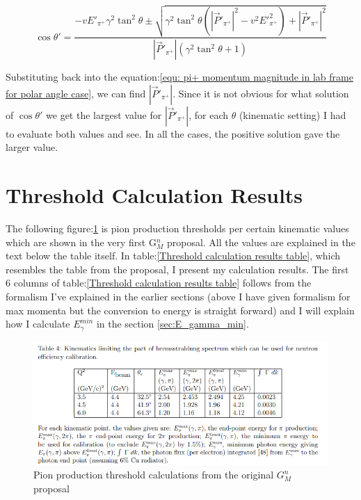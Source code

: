 \documentclass[11pt,letterpaper]{article}
\begin{document}
  \begin{equation}
    \cos{\theta'} = \frac{-vE'_{\pi^+}\gamma^2\tan^2{\theta} \pm \sqrt{\gamma^2\tan^2{\theta}(|\vec{P}'_{\pi^+}|^2-v^2E'^{2}_{\pi^+})+|\vec{P}'_{\pi^+}|^2}}{|\vec{P}'_{\pi^+}|(\gamma^2\tan^2{\theta} + 1)}
 \end{equation}

Substituting back into the equation:\ref{equ: pi+ momentum magnitude in lab frame for polar angle case}, we can find $|\vec{P}'_{\pi^+}|$. Since it is not obvious for what solution of $\cos{\theta'}$ we get the largest value for $|\vec{P}'_{\pi^+}|$, for each $\theta$ (kinematic setting) I had to evaluate both values and see. In all the cases, the positive solution gave the larger value.


\section{Threshold Calculation Results}

The following figure:\ref{fig:table4 from GMn proposal} is pion production thresholds per certain kinematic values which are shown in the very first G$_M^n$ proposal. All the values are explained in the text below the table itself. In table:\ref{Threshold calculation results table}, which resembles the table from the proposal, I present my calculation results. The first 6 columns of table:\ref{Threshold calculation results table} follows from the formalism I've explained in the earlier sections (above I have given formalism for max momenta but the conversion to energy is straight forward) and I will explain how I calculate $E^{min}_\gamma$ in the section \ref{sec:E_gamma_min}.

\begin{figure}[h!]
    \centering
    \includegraphics{Images/Table4-GMn original proposal.png}
    \caption{Pion production threshold calculations from the original $G_M^n$ proposal}
    \label{fig:table4 from GMn proposal}
\end{figure}
\end{document}
